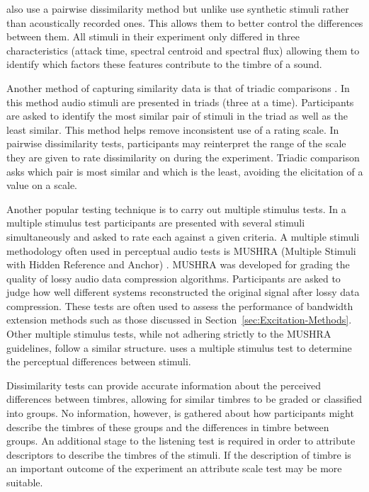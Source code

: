 			\citet{caclin2005acoustic} also use a pairwise dissimilarity method but unlike
			\citet{grey1977multidimensional} use synthetic stimuli rather than acoustically recorded ones. This
			allows them to better control the differences between them. All stimuli in their experiment only
			differed in three characteristics (attack time, spectral centroid and spectral flux) allowing them
			to identify which factors these features contribute to the timbre of a sound.

			Another method of capturing similarity data is that of triadic comparisons
			\citep{wickelmaier2007deriving}. In this method audio stimuli are presented in triads (three at a
			time). Participants are asked to identify the most similar pair of stimuli in the triad as well as
			the least similar. This method helps remove inconsistent use of a rating scale. In pairwise
			dissimilarity tests, participants may reinterpret the range of the scale they are given to rate
			dissimilarity on during the experiment. Triadic comparison asks which pair is most similar and
			which is the least, avoiding the elicitation of a value on a scale.

			Another popular testing technique is to carry out multiple stimulus tests. In a multiple stimulus
			test participants are presented with several stimuli simultaneously and asked to rate each against
			a given criteria. A multiple stimuli methodology often used in perceptual audio tests is MUSHRA
			(Multiple Stimuli with Hidden Reference and Anchor) \citep{mushra2014}. MUSHRA was developed for
			grading the quality of lossy audio data compression algorithms. Participants are asked to judge how
			well different systems reconstructed the original signal after lossy data compression.  These tests
			are often used to assess the performance of bandwidth extension methods such as those discussed in
			Section~\ref{sec:Excitation-Methods}. Other multiple stimulus tests, while not adhering strictly to
			the MUSHRA guidelines, follow a similar structure. \citet{arthi2015influence} uses a multiple
			stimulus test to determine the perceptual differences between stimuli. 
			
			Dissimilarity tests can provide accurate information about the perceived differences between
			timbres, allowing for similar timbres to be graded or classified into groups. No information,
			however, is gathered about how participants might describe the timbres of these groups and
			the differences in timbre between groups. An additional stage to the listening test is required in
			order to attribute descriptors to describe the timbres of the stimuli. If the description of timbre
			is an important outcome of the experiment an attribute scale test may be more suitable.
			
